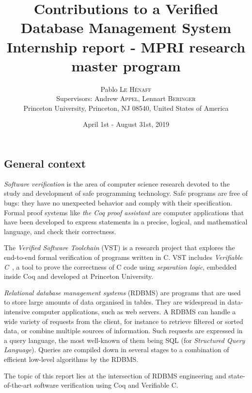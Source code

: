 \documentclass[11pt]{article}
\begin{document}
\title{\vspace{-1cm}Contributions to a Verified Database Management System\\[.3cm]
\large Internship report - MPRI research master program}

\author{Pablo \textsc{Le Hénaff}\\[.5cm]
Supervisors: Andrew \textsc{Appel}, Lennart \textsc{Beringer}\\[.5cm]
Princeton University, Princeton, NJ 08540, United States of America}

\date{April 1st - August 31st, 2019}

\maketitle

\subsection*{General context}

\emph{Software verification} is the area of computer science research devoted to the study and development of safe programming technology.
Safe programs are free of bugs: they have no unexpected behavior and comply with their specification.
Formal proof systems like \emph{the Coq proof assistant} are computer applications that have been developed to express statements in a precise, logical, and mathematical language,
and check their correctness.

The \emph{Verified Software Toolchain} (VST) is a research project that explores the end-to-end formal verification of programs written in C.
VST includes \emph{Verifiable C}~\cite{PLCC}, a tool to prove the correctness of C code using \emph{separation logic}, embedded inside Coq and developed at Princeton University.

\emph{Relational database management systems} (RDBMS) are programs that are used to store large amounts of data organised in tables.
They are widespread in data-intensive computer applications, such as web servers.
A RDBMS can handle a wide variety of requests from the client, for instance to retrieve filtered or sorted data, or combine multiple sources of information.
Such requests are expressed in a query language, the most well-known of them being SQL (for \emph{Structured Query Language}).
Queries are compiled down in several stages to a combination of efficient low-level algorithms by the RDBMS.

The topic of this report lies at the intersection of RDBMS engineering and state-of-the-art software verification using Coq and Verifiable C.
\end{document}
